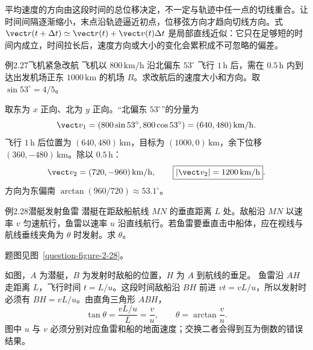 平均速度的方向由这段时间的总位移决定，不一定与轨迹中任一点的切线重合。让时间间隔逐渐缩小，末点沿轨迹逼近初点，位移弦方向才趋向切线方向。式 $\vect r(t+\Delta t)\simeq\vect r(t)+\vect v(t)\Delta t$ 是局部直线近似：它只在足够短的时间内成立，时间拉长后，速度方向或大小的变化会累积成不可忽略的偏差。

\begin{origexamplebox}{例2.27\quad 飞机紧急改航}
飞机以 $800\,\mathrm{km/h}$ 沿北偏东 $53^\circ$ 飞行 $1\,\mathrm h$ 后，需在 $0.5\,\mathrm h$ 内到达出发机场正东 $1000\,\mathrm{km}$ 的机场 $B$。求改航后的速度大小和方向。取 $\sin53^\circ=4/5$。
\end{origexamplebox}
\begin{xesolution}
取东为 $x$ 正向、北为 $y$ 正向。“北偏东 $53^\circ$”的分量为
\[
\vect v_1=(800\sin53^\circ,800\cos53^\circ)=(640,480)\,\mathrm{km/h}.
\]
飞行 $1\,\mathrm h$ 后位置为 $(640,480)\,\mathrm{km}$，目标为 $(1000,0)\,\mathrm{km}$，余下位移 $(360,-480)\,\mathrm{km}$。除以 $0.5\,\mathrm h$：
\[
\vect v_2=(720,-960)\,\mathrm{km/h},\qquad
\boxed{|\vect v_2|=1200\,\mathrm{km/h}}.
\]
方向为东偏南 $\arctan(960/720)\approx53.1^\circ$。
\end{xesolution}

\begin{origexamplebox}{例2.28\quad 潜艇发射鱼雷}
潜艇在距敌船航线 $MN$ 的垂直距离 $L$ 处。敌船沿 $MN$ 以速率 $v$ 匀速航行，鱼雷以速率 $u$ 沿直线航行。若鱼雷要垂直击中船体，应在视线与航线垂线夹角为 $\theta$ 时发射。求 $\theta$。
\par 题图见图~\ref{question-figure-2-28}。
\KQuestionBC
\end{origexamplebox}
\begin{xesolution}
如图，$A$ 为潜艇，$B$ 为发射时敌船的位置，$H$ 为 $A$ 到航线的垂足。
鱼雷沿 $AH$ 走距离 $L$，飞行时间 $t=L/u$。这段时间敌船沿 $BH$ 前进
$vt=vL/u$，所以发射时必须有 $BH=vL/u$。由直角三角形 $ABH$，
\[
  \tan\theta=\frac{vL/u}{L}=\frac vu,\qquad
  \boxed{\theta=\arctan\frac vu}.
\]
图中 $u$ 与 $v$ 必须分别对应鱼雷和船的地面速度；交换二者会得到互为倒数的错误结果。
\begin{center}\end{center}
\end{xesolution}

